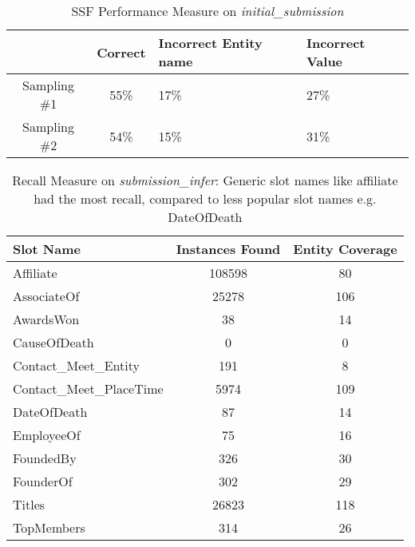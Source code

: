 \begin{table}
\caption{SSF Performance Measure on \textit{initial\_submission} }
\centering
\label{table:initialresult}

\begin{tabular}{ | c | c | p{2cm} | p{13mm} |}
\hline 
 & \textbf{Correct} & \textbf{Incorrect Entity name} & \textbf{Incorrect Value} \\ 
\hline 
Sampling \#1 & 55\% & 17\% & 27\% \\ 
\hline Sampling \#2 & 54\% & 15\% & 31\%  \\ 
\hline 
\end{tabular} 
\end{table}


\begin{table}[h]




\caption{Recall Measure on \textit{submission\_infer}: Generic slot names like affiliate had the most recall, compared to less popular slot names e.g. DateOfDeath}
\centering
\label{table:finalresultrecall}
\begin{tabular}{|l|c|c|}
\hline 
 \textbf{Slot Name} & \textbf{Instances Found} & \textbf{Entity Coverage} \\ 
\hline 
Affiliate & 108598 & 80 \\ \hline 
AssociateOf & 25278 & 106 \\ \hline 
AwardsWon & 38 & 14 \\ \hline 
CauseOfDeath & 0 & 0 \\ \hline 
{\tiny Contact\_Meet\_Entity} & 191 & 8 \\ \hline 
{\tiny Contact\_Meet\_PlaceTime} & 5974 & 109 \\ \hline 
DateOfDeath & 87 & 14 \\ \hline 
EmployeeOf & 75 & 16 \\ \hline 
FoundedBy & 326 & 30 \\ \hline 
FounderOf & 302 &  29 \\ \hline 
Titles & 26823 & 118 \\ \hline 
TopMembers & 314 & 26 \\ \hline 

\end{tabular} 




\end{table}
